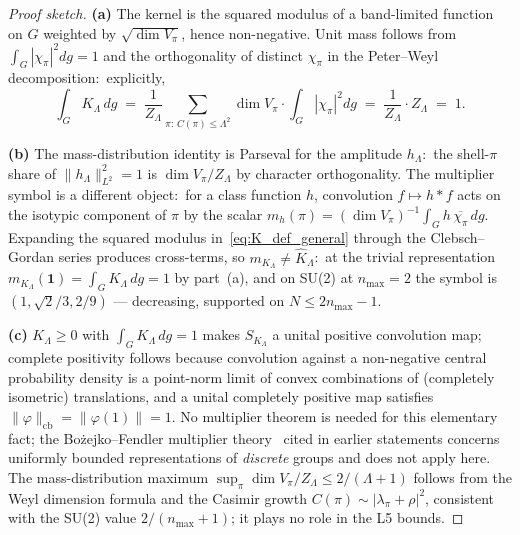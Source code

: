 \documentclass[11pt,a4paper]{article}
\theoremstyle{plain}
\theoremstyle{definition}
\newcommand{\Lammax}{\Lambda}
\newcommand{\cbnorm}[1]{\lVert #1 \rVert_{\mathrm{cb}}}
\newcommand{\norm}[1]{\lVert #1 \rVert}
\newcommand{\Cas}{C}
\newcommand{\KS}{K}
\newcommand{\Khat}{\widehat{K}}
\begin{document}
\begin{proof}[Proof sketch]
\textbf{(a)} The kernel is the squared modulus of a band-limited
function on $G$ weighted by $\sqrt{\dim V_\pi}$, hence non-negative.
Unit mass follows from $\int_G |\chi_\pi|^2 dg = 1$ and the orthogonality
of distinct $\chi_\pi$ in the Peter--Weyl decomposition:\ explicitly,
\begin{equation*}
   \int_G \KS_\Lammax\, dg
   \;=\; \frac{1}{Z_\Lammax}
   \sum_{\pi:\, \Cas(\pi) \le \Lammax^2}\!\!
   \dim V_\pi \cdot \int_G |\chi_\pi|^2 dg
   \;=\; \frac{1}{Z_\Lammax} \cdot Z_\Lammax
   \;=\; 1.
\end{equation*}

\textbf{(b)} The mass-distribution identity is Parseval for the
amplitude $h_\Lammax$:\ the shell-$\pi$ share of
$\norm{h_\Lammax}_{L^2}^2 = 1$ is $\dim V_\pi / Z_\Lammax$ by
character orthogonality. The multiplier symbol is a different
object:\ for a class function $h$, convolution $f \mapsto h * f$ acts
on the isotypic component of $\pi$ by the scalar
$m_h(\pi) = (\dim V_\pi)^{-1} \int_G h\, \overline{\chi_\pi}\, dg$.
Expanding the squared modulus in~\eqref{eq:K_def_general} through the
Clebsch--Gordan series produces cross-terms, so
$m_{\KS_\Lammax} \ne \Khat_\Lammax$:\ at the trivial representation
$m_{\KS_\Lammax}(\mathbf 1) = \int_G \KS_\Lammax\, dg = 1$ by
part~(a), and on SU(2) at $n_{\max} = 2$ the symbol is
$(1, \sqrt2/3, 2/9)$ — decreasing, supported on $N \le 2n_{\max}-1$.

\textbf{(c)} $\KS_\Lammax \ge 0$ with $\int_G \KS_\Lammax\, dg = 1$
makes $S_{\KS_\Lammax}$ a unital positive convolution map; complete
positivity follows because convolution against a non-negative central
probability density is a point-norm limit of convex combinations of
(completely isometric) translations, and a unital completely positive
map satisfies $\cbnorm{\varphi} = \norm{\varphi(1)} = 1$. No
multiplier theorem is needed for this elementary fact; the
Bo{\.z}ejko--Fendler multiplier theory~\cite{bozejko_fendler1991}
cited in earlier statements concerns uniformly bounded representations of
\emph{discrete} groups and does not apply here. The mass-distribution
maximum $\sup_\pi \dim V_\pi / Z_\Lammax \le 2/(\Lammax + 1)$ follows
from the Weyl dimension formula and the Casimir growth
$\Cas(\pi) \sim |\lambda_\pi + \rho|^2$, consistent with the SU(2)
value $2/(n_{\max} + 1)$; it plays no role in the L5 bounds.


\end{proof}
\end{document}
